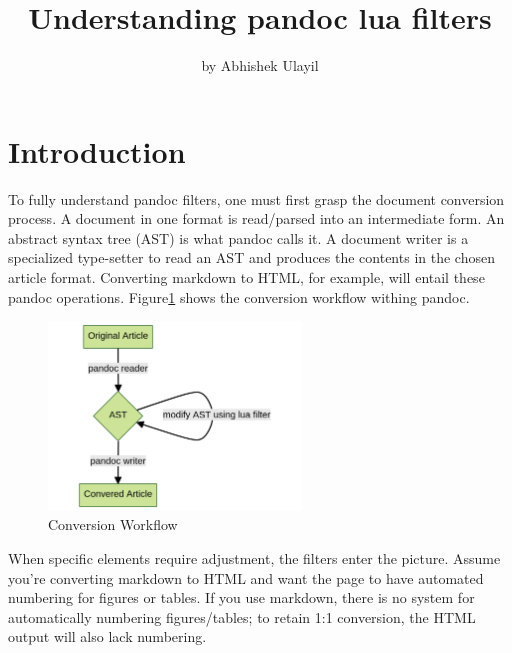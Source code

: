 \title{Understanding pandoc lua filters}
\author{by Abhishek Ulayil}

\maketitle


\section{Introduction}
To fully understand pandoc filters, one must first grasp the document conversion process. A document in one format is read/parsed into an intermediate form. An abstract syntax tree (AST) is what pandoc calls it. A document writer is a specialized type-setter to read an AST and produces the contents in the chosen article format. Converting markdown to HTML, for example, will entail these pandoc operations. Figure\ref{fig:workflow} shows the conversion workflow withing pandoc.

\begin{figure}[htbp]
  \centering
  \includegraphics[width=0.6\textwidth]{figures/workflow.png}
  \caption{Conversion Workflow}
  \label{fig:workflow}
\end{figure}

When specific elements require adjustment, the filters enter the picture. Assume you're converting markdown to HTML and want the page to have automated numbering for figures or tables. 
If you use markdown, there is no system for automatically numbering figures/tables; to retain 1:1 conversion, the HTML output will also lack numbering. 

